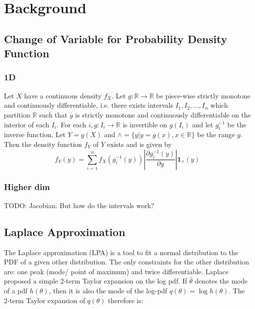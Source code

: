 \section{Background}
\label{sec:background}

\subsection{Change of Variable for Probability Density Function}
\label{subsec:variable_change_pdf}

\subsubsection*{1D}
Let $X$ have a continuous density $f_X$. Let $g: \mathbb{R} \rightarrow \mathbb{R}$ be piece-wise strictly monotone and continuously differentiable, i.e. there exists intervals $I_1,I_2, ..., I_n$ which partition $\mathbb{R}$ such that $g$ is strictly monotone and continuously differentiable on the interior of each $I_i$. For each $i, g:I_i \rightarrow \mathbb{R}$ is invertible on $g(I_i)$ and let $g_i^{-1}$ be the inverse function. Let $Y = g(X)$ and $\wedge = \{y| y=g(x), x \in \mathbb{R}\}$ be the range $g$. Then the density function $f_Y$ of $Y$ exists and is given by 
\begin{equation}
\label{eq:1D_variable_transform}
f_Y(y) = \sum_{i=1}^{n} f_X(g_i^{-1}(y)) \left\vert\frac{\partial g_i^{-1}(y)}{\partial y} \right\vert \mathbf{1}_\wedge(y) 
\end{equation}

\subsubsection*{Higher dim}
TODO: Jacobian. But how do the intervals work?


\subsection{Laplace Approximation}

The Laplace approximation (LPA) is a tool to fit a normal distribution to the PDF of a given other distribution. The only constraints for the other distribution are: one peak (mode/ point of maximum) and twice differentiable. Laplace proposed a simple 2-term Taylor expansion on the log pdf. If $\hat{\theta}$ denotes the mode of a pdf $h(\theta)$, then it is also the mode of the log-pdf $q(\theta) = \log h(\theta)$. The 2-term Taylor expansion of $q(\theta)$ therefore is:

